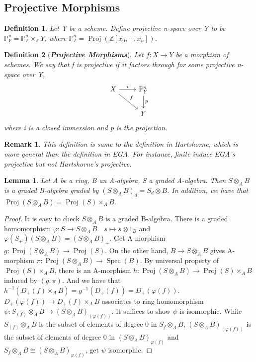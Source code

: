 \documentclass{ctexart}
\newtheorem{definition}{Definition}[section]
\newtheorem{remark}{Remark}[section]
\newtheorem{lemma}{Lemma}[section]
\newcommand{\spec}{\operatorname{Spec}}
\newcommand{\proj}{\operatorname{Proj}}
\begin{document}
\subsection{Projective Morphisms}
\begin{definition}
    Let Y be a scheme.
    Define projective n-space over Y to be $\mathbb{P}_{Y}^{n} = \mathbb{P}_{\mathbb{Z}}^{n} \times_{\mathbb{Z}} Y$,
    where $\mathbb{P}_{\mathbb{Z}}^{n} = \proj(\mathbb{Z}[x_{0}, \cdots, x_{n}])$.
\end{definition}
\begin{definition}[\textbf{\emph{Projective Morphisms}}]
    Let $f: X \longrightarrow Y$ be a morphism of schemes.
    We say that f is projective if it factors through for some projective n-space over Y,
    \begin{equation*}
        \begin{tikzcd}
            X \arrow[r, "i"] \arrow[dr, "f"] &
            \mathbb{P}_{Y}^{n} \arrow[d, "p"] \\
            & Y
        \end{tikzcd}
    \end{equation*}
    where i is a closed immersion and p is the projection.
\end{definition}
\begin{remark}
    This definition is same to the definition in Hartshorne, which is more general than the definition in EGA.
    For instance, finite induce EGA's projective but not Hartshorne's projective.
\end{remark}
\begin{lemma}
    Let $A$ be a ring, B an A-algebra, S a graded A-algebra.
    Then $S \otimes_{A} B$ is a graded B-algebra graded by $(S \otimes_{A} B)_{d} = S_{d} \otimes B$.
    In addition, we have that $\proj(S \otimes_{A} B) = \proj(S) \times_{A} B$.
    \label{Lemma 4.3}
\end{lemma}
\begin{proof}
    It is easy to check $S \otimes_{A} B$ is a graded B-algebra.
    There is a graded homomorphism $\varphi: S \longrightarrow S \otimes_{A} B\quad s \longmapsto s \otimes 1_{B}$ and $\varphi(S_{+})(S \otimes_{A} B) = (S \otimes_{A} B)_{+}$.
    Get A-morphism $g: \proj(S \otimes_{A} B) \longrightarrow \proj(S)$.
    On the other hand, $B \longrightarrow S \otimes_{A} B$ gives A-morphism $\pi: \proj(S \otimes_{A} B) \longrightarrow \spec(B)$.
    By universal property of $\proj(S) \times_{A} B$, there is an A-morphism $h: \proj(S \otimes_{A} B) \longrightarrow \proj(S) \times_{A} B$ induced by $(g, \pi)$.
    And we have that $h^{-1}(D_{+}(f) \times_{A} B) = g^{-1}(D_{+}(f)) = D_{+}(\varphi(f))$.
    $D_{+}(\varphi(f)) \longrightarrow D_{+}(f) \times_{A} B$ associates to ring homomorphism $\psi: S_{(f)} \otimes_{A} B \longrightarrow (S \otimes_{A} B)_{(\varphi(f))}$.
    It suffices to show $\psi$ is isomorphic.
    While $S_{(f)} \otimes_{A} B$ is the subset of elements of degree 0 in $S_{f} \otimes_{A} B$, $(S \otimes_{A} B)_{(\varphi(f))}$ is the subset of elements of degree 0 in $(S \otimes_{A} B)_{\varphi(f)}$ and $S_{f} \otimes_{A} B \cong (S \otimes_{A} B)_{\varphi(f)}$, get $\psi$ isomorphic.
\end{proof}
\end{document}
